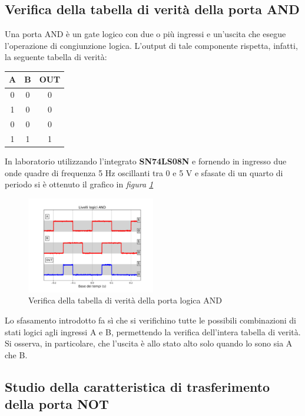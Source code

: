 \documentclass[journal]{IEEEtran}
\begin{document}
\subsection{Verifica della tabella di verità della porta AND}
Una porta AND è un gate logico con due o più ingressi e un'uscita che esegue l'operazione di congiunzione logica. L'output di tale componente rispetta, infatti, la seguente tabella di verità:
\begin{center}
\begin{tabular}{ |c|c|c| } 
 \hline
 \rowcolor{lightgray}
 A & B & OUT \\ \hline \hline
 0 & 0 & 0 \\ \hline
 1 & 0 & 0 \\ \hline
 0 & 0 & 0 \\ \hline
 1 & 1 & 1 \\ \hline
\end{tabular}
\end{center}
In laboratorio utilizzando l'integrato \textbf{SN74LS08N} e fornendo in ingresso due onde quadre di frequenza 5 Hz oscillanti tra 0 e 5 V e sfasate di un quarto di periodo si è ottenuto il grafico in  \textit{figura \ref{fig:AND-table}} 
\begin{figure}[H]%
\begin{center}
\includegraphics[width=0.50\textwidth]{analysis/output/AND-all.pdf}
\caption{Verifica della tabella di verità della porta logica AND}
\label{fig:AND-table}
\end{center}
\end{figure}

Lo sfasamento introdotto fa sì che si verifichino tutte le possibili combinazioni di stati logici agli ingressi A e B, permettendo la verifica dell'intera tabella di verità. Si osserva, in particolare, che l'uscita è allo stato alto solo quando lo sono sia A che B.

\subsection{Studio della caratteristica di trasferimento della porta NOT}
\end{document}
